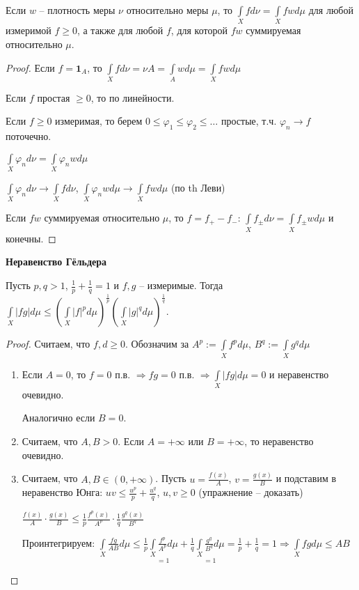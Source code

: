 \begin{theorem}
    Если $w$ – плотность меры $\nu$ относительно меры $\mu$, то $\int\limits_X f d\nu = \int\limits_X f w d\mu $ 
    для любой измеримой $f\geq 0$, а также для любой $f$, для которой $fw$ суммируемая относительно $\mu$.
\end{theorem}

\begin{proof}
    Если $f=\mathbf{1}_A$, то $\int\limits_X fd\nu = \nu A = \int\limits_A wd\mu = \int\limits_X fwd\mu$

    Если $f$ простая $\geq 0$, то по линейности.

    Если $f\geq 0$ измеримая, то берем $0\leq \varphi_1\leq \varphi_2 \leq \dots$ простые, т.ч. $\varphi_n\rightarrow f$ поточечно.

    $\int\limits_X \varphi_n d\nu = \int\limits_X \varphi_n wd\mu$

    $\int\limits_X \varphi_n d\nu\rightarrow \int\limits_X f d\nu $, $\int\limits_X \varphi_n wd\mu\rightarrow \int\limits_X fwd\mu$ (по th Леви)

    Если $fw$ суммируемая относительно $\mu$, то $f=f_+-f_-$: $\int\limits_X f_\pm d\nu = \int\limits_X f_\pm w d\mu$ и конечны.
\end{proof}

\begin{theorem}
    \textbf{Неравенство Гёльдера}

    Пусть $p, q> 1$, $\frac{1}{p}+\frac{1}{q}=1$ и $f, g$ – измеримые. Тогда 
    $\int\limits_X |fg|d\mu \leq (\int\limits_X |f|^p d\mu)^{\frac{1}{p}}(\int\limits_X |g|^q d\mu)^\frac{1}{q}$.
\end{theorem}

\begin{proof}
    Считаем, что $f, d\geq 0$. Обозначим за $A^p:=\int\limits_X f^p d\mu$, $B^q:=\int\limits_X g^q d\mu$

    \begin{enumerate}
        \item Если $A=0$, то $f=0$ п.в. $\Rightarrow fg=0$ п.в. $\Rightarrow \int\limits_X |fg|d\mu=0$ и неравенство очевидно.
        
        Аналогично если $B=0$.

        \item Считаем, что $A, B > 0$. Если $A=+\infty$ или $B=+\infty$, то неравенство очевидно.
        
        \item Считаем, что $A, B \in (0, +\infty)$. Пусть $u=\frac{f(x)}{A}$, $v=\frac{g(x)}{B}$ и подставим в 
        неравенство Юнга: $uv\leq \frac{u^p}{p}+\frac{u^q}{q}$, $u, v\geq 0$ (упражнение – доказать)

        $\frac{f(x)}{A}\cdot \frac{g(x)}{B} \leq \frac{1}{p}\frac{f^p(x)}{A^p}\cdot \frac{1}{q}\frac{g^q(x)}{B^q}$

        Проинтегрируем: $\int\limits_X \frac{fg}{AB} d\mu \leq \frac{1}{p}\underset{=1}{\int\limits_X \frac{f^p}{A^p} d\mu} + \frac{1}{q}\underset{=1}{\int\limits_X \frac{g^q}{B^q} d\mu} =
        \frac{1}{p} + \frac{1}{q} = 1\Rightarrow \int\limits_X fg d\mu\leq AB$
    \end{enumerate}
\end{proof}

